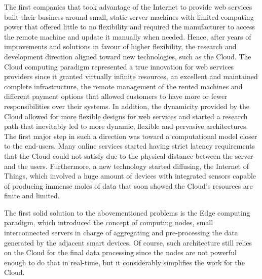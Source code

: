The first companies that took advantage of the Internet to provide web services built their business around small, static server machines with limited computing power that offered little to no flexibility and required the manufacturer to access the remote machine and update it manually when needed. Hence, after years of improvements and solutions in favour of higher flexibility, the research and development direction aligned toward new technologies, such as the Cloud.
The Cloud computing paradigm represented a true innovation for web services providers since it granted virtually infinite resources, an excellent and maintained complete infrastructure, the remote management of the rented machines and different payment options that allowed customers to have more or fewer responsibilities over their systems. In addition, the dynamicity provided by the Cloud allowed for more flexible designs for web services and started a research path that inevitably led to more dynamic, flexible and pervasive architectures. The first major step in such a direction was toward a computational model closer to the end-users. Many online services started having strict latency requirements that the Cloud could not satisfy due to the physical distance between the server and the users. Furthermore, a new technology started diffusing, the Internet of Things, which involved a huge amount of devices with integrated sensors capable of producing immense moles of data that soon showed the Cloud's resources are finite and limited.

The first solid solution to the abovementioned problems is the Edge computing paradigm, which introduced the concept of computing nodes, small interconnected servers in charge of aggregating and pre-processing the data generated by the adjacent smart devices. Of course, such architecture still relies on the Cloud for the final data processing since the nodes are not powerful enough to do that in real-time, but it considerably simplifies the work for the Cloud.

